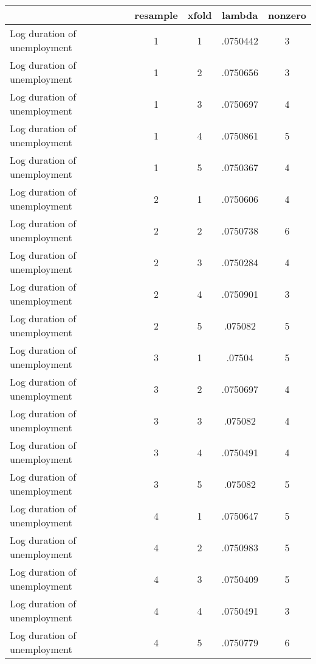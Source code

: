 \begin{tabular}{l*{4}{c}}
\hline\hline
                    &    resample&       xfold&      lambda&     nonzero\\
\hline
Log duration of unemployment&           1&           1&    .0750442&           3\\
Log duration of unemployment&           1&           2&    .0750656&           3\\
Log duration of unemployment&           1&           3&    .0750697&           4\\
Log duration of unemployment&           1&           4&    .0750861&           5\\
Log duration of unemployment&           1&           5&    .0750367&           4\\
Log duration of unemployment&           2&           1&    .0750606&           4\\
Log duration of unemployment&           2&           2&    .0750738&           6\\
Log duration of unemployment&           2&           3&    .0750284&           4\\
Log duration of unemployment&           2&           4&    .0750901&           3\\
Log duration of unemployment&           2&           5&     .075082&           5\\
Log duration of unemployment&           3&           1&      .07504&           5\\
Log duration of unemployment&           3&           2&    .0750697&           4\\
Log duration of unemployment&           3&           3&     .075082&           4\\
Log duration of unemployment&           3&           4&    .0750491&           4\\
Log duration of unemployment&           3&           5&     .075082&           5\\
Log duration of unemployment&           4&           1&    .0750647&           5\\
Log duration of unemployment&           4&           2&    .0750983&           5\\
Log duration of unemployment&           4&           3&    .0750409&           5\\
Log duration of unemployment&           4&           4&    .0750491&           3\\
Log duration of unemployment&           4&           5&    .0750779&           6\\

\end{tabular}

